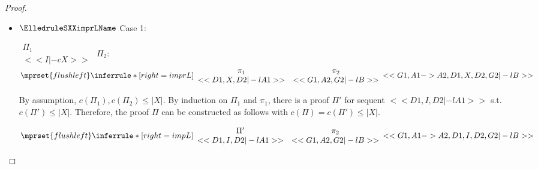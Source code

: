\begin{proof}
\begin{enumerate}
\begin{itemize}
  \item $\ElledruleSXXimprLName$ Case 1:
      \begin{center}
        \scriptsize
        \begin{math}
          \begin{array}{c}
            \Pi_1 \\
            {<<I |-c X>>}
          \end{array}
        \end{math}
        \qquad\qquad
        $\Pi_2$:
        \begin{math}
          $$\mprset{flushleft}
          \inferrule* [right={\tiny imprL}] {
            {
              \begin{array}{cc}
                \pi_1 & \pi_2 \\
                {<<D1, X, D2 |-l A1>>} & {<<G1, A2, G2 |-l B>>}
              \end{array}
            }
          }{<<G1, A1 -> A2, D1, X, D2, G2 |-l B>>}
        \end{math}
      \end{center}
      By assumption, $c(\Pi_1),c(\Pi_2)\leq |X|$. By induction on $\Pi_1$ and $\pi_1$, there is
      a proof $\Pi'$ for sequent $<<D1, I, D2 |-l A1>>$ s.t. $c(\Pi') \leq |X|$. Therefore, the
      proof $\Pi$ can be constructed as follows with $c(\Pi) = c(\Pi') \leq |X|$.
      \begin{center}
        \scriptsize
        \begin{math}
          $$\mprset{flushleft}
          \inferrule* [right={\tiny impL}] {
            {
              \begin{array}{cc}
                \Pi' & \pi_2 \\
                {<<D1, I, D2 |-l A1>>} & {<<G1, A2, G2 |-l B>>}
              \end{array}
            }
          }{<<G1, A1 -> A2, D1, I, D2, G2 |-l B>>}
        \end{math}
      \end{center}


\end{itemize}
\end{enumerate}
\end{proof}

